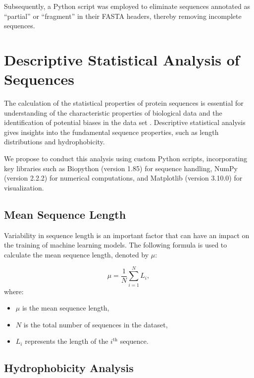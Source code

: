 Subsequently, a Python script was employed to eliminate sequences annotated as ``partial'' or ``fragment'' in their FASTA headers, thereby removing incomplete sequences.

\section{Descriptive Statistical Analysis of Sequences}
\label{section:descriptive_statistical_analysis}

The calculation of the statistical properties of protein sequences is essential for understanding of the characteristic properties of biological data and the identification of potential biases in the data set \cite{durbin1998biological}.
Descriptive statistical analysis gives insights into the fundamental sequence properties, such as length distributions and hydrophobicity.

We propose to conduct this analysis using custom Python scripts, incorporating key libraries such as Biopython (version 1.85) \cite{cock2009biopython} for sequence handling, NumPy (version 2.2.2) for numerical computations, and Matplotlib (version 3.10.0) for visualization.

\subsection{Mean Sequence Length}
\label{subsection:mean_sequence_length}

Variability in sequence length is an important factor that can have an impact on the training of machine learning models.
The following formula is used to calculate the mean sequence length, denoted by $\mu$:

\begin{equation}
	\mu = \frac{1}{N} \sum_{i=1}^{N} L_i,
	\label{eq:mean_sequence_length}
\end{equation}
where:
\begin{itemize}
	\item $\mu$ is the mean sequence length,
	\item $N$ is the total number of sequences in the dataset,
	\item $L_i$ represents the length of the $i^\text{th}$ sequence.
\end{itemize}


\subsection{Hydrophobicity Analysis}
\label{subsection:hydrophobicity}

